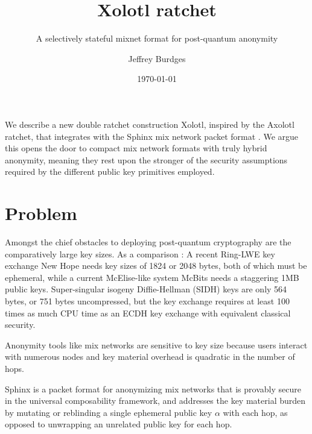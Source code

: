 \documentclass[twoside,letterpaper]{sig-alternate}
\title{Xolotl ratchet}
\subtitle{A selectively stateful mixnet format for post-quantum anonymity}
\author{Jeffrey Burdges}
\date{\today}
\begin{document}
\maketitle



We describe a new double ratchet construction Xolotl,
 inspired by the Axolotl ratchet, %
that integrates with the Sphinx mix network packet format \cite{Sphinx}.
We argue this opens the door to compact mix network formats with
truly hybrid anonymity, meaning they rest upon the stronger of
 the security assumptions required by
 the different public key primitives employed.


\section{Problem} %

Amongst the chief obstacles to deploying post-quantum cryptography are
the comparatively large key sizes.  As a comparison : 
%
A recent Ring-LWE key exchange New Hope \cite[\S7, p.10]{NewHope} needs
 key sizes of 1824 or 2048 bytes, both of which must be ephemeral,
while a current McElise-like system McBits %
 needs a staggering 1MB public keys.
%
Super-singular isogeny Diffie-Hellman (SIDH) \cite[p. 21]{SIDH-2016} keys
are only 564 bytes, or 751 bytes uncompressed, but
 the key exchange requires at least 100 times as much CPU time as
 an ECDH key exchange with equivalent classical security.

Anonymity tools like mix networks are sensitive to key size because 
users interact with numerous nodes and key material overhead is 
quadratic in the number of hops. %

\smallskip

Sphinx \cite{Sphinx} is a packet format for anonymizing mix networks
that is provably secure in the universal composability framework, and
 addresses the key material burden by mutating or reblinding a
 single ephemeral public key $\alpha$ with each hop,
 as opposed to unwrapping an unrelated public key for each hop.
\end{document}
